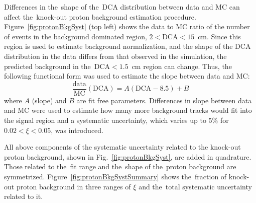 Differences in the~shape of the~$\textrm{DCA}$ distribution between data and \ac{MC} can affect the~knock-out proton background estimation procedure. Figure~\ref{fig:protonBkgSyst} (top left) shows the data to MC ratio of  the  number of events in the background dominated region, $2<\textrm{DCA}<15$~cm. 
Since this region is used to estimate background normalization, and the shape of the $\textrm{DCA}$ distribution in the data differs from that observed in the simulation, the predicted background in the~$\textrm{DCA} <1.5$~cm region can change. Thus, the following functional form was used to estimate the slope between data and MC:
\begin{equation}
\frac{\textrm{data}}{\textrm{MC}}\left(\textrm{DCA}\right) = A(\textrm{DCA}-8.5)+B
\label{eq:slopeBkgFit}
\end{equation}
where $A$ (slope) and  $B$ are fit free parameters. Differences in slope between data and \ac{MC} were used to estimate how many
more background tracks would fit into the signal region and a systematic uncertainty, which varies up to $5\%$ for $0.02< \xi<0.05$, was introduced. 




All above components of the systematic uncertainty related to the knock-out proton background,  shown in Fig.~\ref{fig:protonBkgSyst}, are added in quadrature.
Those related to the~fit range and the~shape of the~proton background are symmetrized. Figure~\ref{fig:protonBkgSystSummary} shows the~fraction of knock-out proton background in three ranges of $\xi$ and the~total systematic uncertainty related to it.

